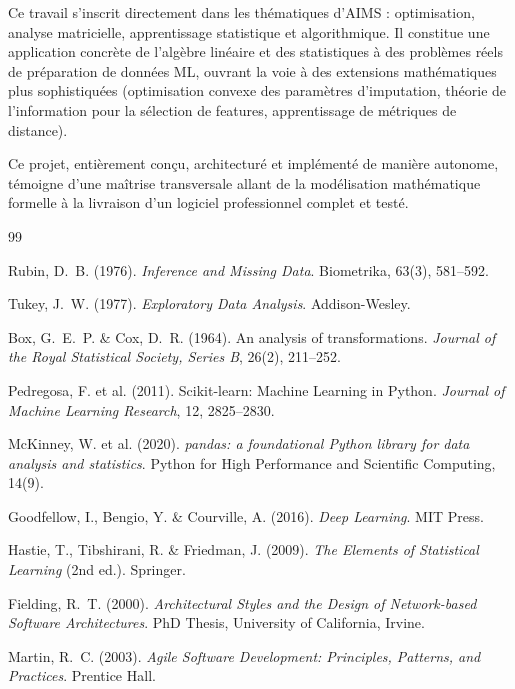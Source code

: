 \documentclass[12pt,a4paper]{article}
\begin{document}
\begin{tcolorbox}[enhanced, colback=TitleColor!8, colframe=TitleColor,
  fonttitle=\bfseries, title={Portée scientifique --- Lien avec AIMS}]
Ce travail s'inscrit directement dans les thématiques d'AIMS : optimisation,
analyse matricielle, apprentissage statistique et algorithmique.
Il constitue une application concrète de l'algèbre linéaire et des statistiques
à des problèmes réels de préparation de données ML, ouvrant la voie à des
extensions mathématiques plus sophistiquées (optimisation convexe des paramètres
d'imputation, théorie de l'information pour la sélection de features,
apprentissage de métriques de distance).

Ce projet, entièrement conçu, architecturé et implémenté de manière autonome,
témoigne d'une maîtrise transversale allant de la modélisation mathématique
formelle à la livraison d'un logiciel professionnel complet et testé.
\end{tcolorbox}

\newpage
\begin{thebibliography}{99}

Rubin, D.~B. (1976).
\textit{Inference and Missing Data}.
Biometrika, 63(3), 581--592.

Tukey, J.~W. (1977).
\textit{Exploratory Data Analysis}.
Addison-Wesley.

Box, G.~E.~P. \& Cox, D.~R. (1964).
An analysis of transformations.
\textit{Journal of the Royal Statistical Society, Series B}, 26(2), 211--252.

Pedregosa, F. et al. (2011).
Scikit-learn: Machine Learning in Python.
\textit{Journal of Machine Learning Research}, 12, 2825--2830.

McKinney, W. et al. (2020).
\textit{pandas: a foundational Python library for data analysis and statistics}.
Python for High Performance and Scientific Computing, 14(9).

Goodfellow, I., Bengio, Y. \& Courville, A. (2016).
\textit{Deep Learning}. MIT Press.

Hastie, T., Tibshirani, R. \& Friedman, J. (2009).
\textit{The Elements of Statistical Learning} (2nd ed.).
Springer.

Fielding, R.~T. (2000).
\textit{Architectural Styles and the Design of Network-based Software Architectures}.
PhD Thesis, University of California, Irvine.

Martin, R.~C. (2003).
\textit{Agile Software Development: Principles, Patterns, and Practices}.
Prentice Hall.

\end{thebibliography}
\end{document}
